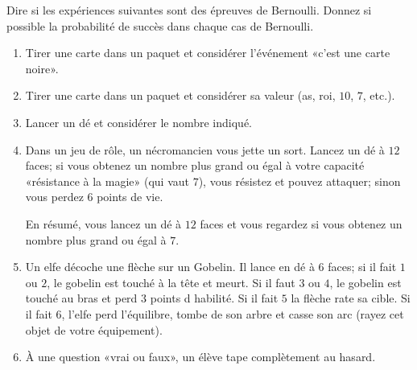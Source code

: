 
\begin{exercice}\label{exoPremiere-0071}

    Dire si les expériences suivantes sont des épreuves de Bernoulli. Donnez si possible la probabilité de succès dans chaque cas de Bernoulli.
    \begin{multicols}{2}
        \begin{enumerate}
            \item
                Tirer une carte dans un paquet et considérer l'événement «c'est une carte noire». 
            \item
                Tirer une carte dans un paquet et considérer sa valeur (as, roi, \( 10\), \( 7\), etc.).
            \item
                Lancer un dé et considérer le nombre indiqué.
            \item
                Dans un jeu de rôle, un nécromancien vous jette un sort. Lancez un dé à \( 12\) faces; si vous obtenez un nombre plus grand ou égal à votre capacité «résistance à la magie» (qui vaut \( 7\)), vous résistez et pouvez attaquer; sinon vous perdez \( 6\) points de vie.

                En résumé, vous lancez un dé à \( 12\) faces et vous regardez si vous obtenez un nombre plus grand ou égal à \( 7\).
            \item
                Un elfe décoche une flèche sur un Gobelin. Il lance en dé à \( 6\) faces; si il fait \( 1\) ou \( 2\), le gobelin est touché à la tête et meurt. Si il faut \( 3\) ou \( 4\), le gobelin est touché au bras et perd \( 3\) points d habilité. Si il fait \( 5\) la flèche rate sa cible. Si il fait \( 6\), l'elfe perd l'équilibre, tombe de son arbre et casse son arc (rayez cet objet de votre équipement).
            \item
                À une question «vrai ou faux», un élève tape complètement au hasard.
        \end{enumerate}
    \end{multicols}

\end{exercice}
